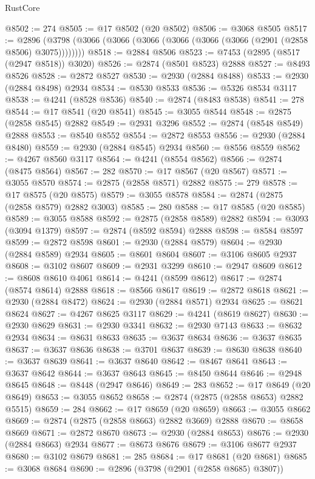 \begin{lexlean}{RustCore}
\begin{coremodule}
@8502 := 274
@8505 := @17 @8502 (@20 @8502)
@8506 := @3068 @8505
@8517 := @2896 (@3798 (@3066 (@3066 (@3066 (@3066 (@3066 (@3066 (@2901 (@2858 @8506) @3075))))))))
@8518 := @2884 @8506
@8523 := @7453 (@2895 (@8517 (@2947 @8518)) @3020)
@8526 := @2874 (@8501 @8523) @2888
@8527 := @8493 @8526
@8528 := @2872 @8527
@8530 := @2930 (@2884 @8488)
@8533 := @2930 (@2884 @8498) @2934
@8534 := @8530 @8533
@8536 := @5326 @8534 @3117
@8538 := @4241 (@8528 @8536)
@8540 := @2874 (@8483 @8538)
@8541 := 278
@8544 := @17 @8541 (@20 @8541)
@8545 := @3055 @8544
@8548 := @2875 (@2858 @8545) @2882
@8549 := @2931 @3296
@8552 := @2874 (@8548 @8549) @2888
@8553 := @8540 @8552
@8554 := @2872 @8553
@8556 := @2930 (@2884 @8480)
@8559 := @2930 (@2884 @8545) @2934
@8560 := @8556 @8559
@8562 := @4267 @8560 @3117
@8564 := @4241 (@8554 @8562)
@8566 := @2874 (@8475 @8564)
@8567 := 282
@8570 := @17 @8567 (@20 @8567)
@8571 := @3055 @8570
@8574 := @2875 (@2858 @8571) @2882
@8575 := 279
@8578 := @17 @8575 (@20 @8575)
@8579 := @3055 @8578
@8584 := @2874 (@2875 (@2858 @8579) @2882 @3003)
@8585 := 280
@8588 := @17 @8585 (@20 @8585)
@8589 := @3055 @8588
@8592 := @2875 (@2858 @8589) @2882
@8594 := @3093 (@3094 @1379)
@8597 := @2874 (@8592 @8594) @2888
@8598 := @8584 @8597
@8599 := @2872 @8598
@8601 := @2930 (@2884 @8579)
@8604 := @2930 (@2884 @8589) @2934
@8605 := @8601 @8604
@8607 := @3106 @8605 @2937
@8608 := @3102 @8607
@8609 := @2931 @3299
@8610 := @2947 @8609
@8612 := @8608 @8610 @4061
@8614 := @4241 (@8599 @8612)
@8617 := @2874 (@8574 @8614) @2888
@8618 := @8566 @8617
@8619 := @2872 @8618
@8621 := @2930 (@2884 @8472)
@8624 := @2930 (@2884 @8571) @2934
@8625 := @8621 @8624
@8627 := @4267 @8625 @3117
@8629 := @4241 (@8619 @8627)
@8630 := @2930 @8629
@8631 := @2930 @3341
@8632 := @2930 @7143
@8633 := @8632 @2934
@8634 := @8631 @8633
@8635 := @3637 @8634
@8636 := @3637 @8635
@8637 := @3637 @8636
@8638 := @3701 @8637
@8639 := @8630 @8638
@8640 := @3637 @8639
@8641 := @3637 @8640
@8642 := @8467 @8641
@8643 := @3637 @8642
@8644 := @3637 @8643
@8645 := @8450 @8644
@8646 := @2948 @8645
@8648 := @8448 (@2947 @8646)
@8649 := 283
@8652 := @17 @8649 (@20 @8649)
@8653 := @3055 @8652
@8658 := @2874 (@2875 (@2858 @8653) @2882 @5515)
@8659 := 284
@8662 := @17 @8659 (@20 @8659)
@8663 := @3055 @8662
@8669 := @2874 (@2875 (@2858 @8663) @2882 @3669) @2888
@8670 := @8658 @8669
@8671 := @2872 @8670
@8673 := @2930 (@2884 @8653)
@8676 := @2930 (@2884 @8663) @2934
@8677 := @8673 @8676
@8679 := @3106 @8677 @2937
@8680 := @3102 @8679
@8681 := 285
@8684 := @17 @8681 (@20 @8681)
@8685 := @3068 @8684
@8690 := @2896 (@3798 (@2901 (@2858 @8685) @3807))

\end{coremodule}
\end{lexlean}
